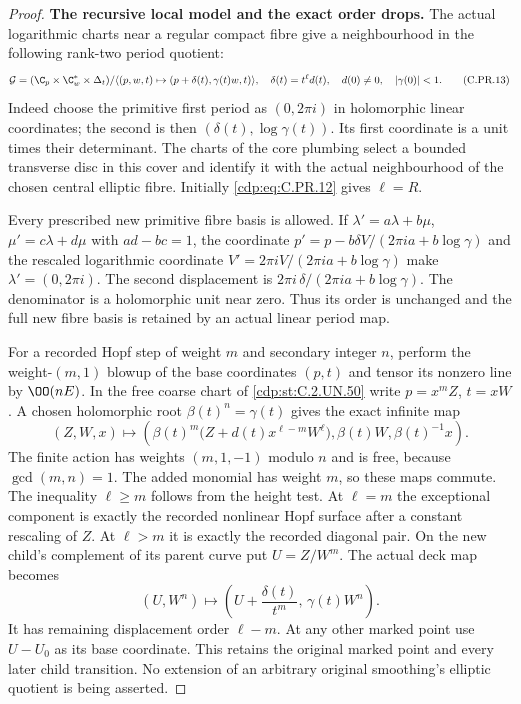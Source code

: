 \begin{proof}
\par\medskip\noindent\textbf{The recursive local model and the exact order drops.}
The actual logarithmic charts near a regular compact fibre give
a neighbourhood in the following rank-two period quotient:
\[
 \mathcal G=
 (\C_p\times\C_w^*\times\Delta_t)/
 \langle(p,w,t)\mapsto(p+\delta(t),\gamma(t)w,t)\rangle,
 \quad
 \delta(t)=t^\ell d(t),\quad d(0)\ne0,\quad|\gamma(0)|<1 .
                                                        \tag{C.PR.13}\label{cdp:eq:C.PR.13}
\]
Indeed choose the primitive first period as $(0,2\pi i)$ in
holomorphic linear coordinates; the second is then
$(\delta(t),\log\gamma(t))$. Its first coordinate is a unit
times their determinant. The charts of the core plumbing select
a bounded transverse disc in this cover and identify it with
the actual neighbourhood of the chosen central elliptic fibre.
Initially \eqref{cdp:eq:C.PR.12} gives $\ell=R$.

Every prescribed new primitive fibre basis is allowed. If
$\lambda'=a\lambda+b\mu$, $\mu'=c\lambda+d\mu$ with
$ad-bc=1$, the coordinate
$p'=p-b\delta V/(2\pi ia+b\log\gamma)$ and the rescaled
logarithmic coordinate
$V'=2\pi iV/(2\pi ia+b\log\gamma)$ make $\lambda'=(0,2\pi i)$.
The second displacement is
$2\pi i\,\delta/(2\pi ia+b\log\gamma)$.
The denominator is a holomorphic unit near zero.
Thus its order is unchanged and the full new fibre basis is
retained by an actual linear period map.

For a recorded Hopf step of weight $m$ and secondary integer $n$,
perform the weight-$(m,1)$ blowup of the base coordinates $(p,t)$
and tensor its nonzero line by $\OO(nE)$. In the free coarse
chart of \ref{cdp:st:C.2.UN.50} write $p=x^mZ$, $t=xW$.
A chosen holomorphic root $\beta(t)^n=\gamma(t)$ gives the exact
infinite map
\[
 (Z,W,x)\longmapsto
 \left(\beta(t)^m
    \bigl(Z+d(t)x^{\ell-m}W^\ell\bigr),
       \beta(t)W,\beta(t)^{-1}x\right).
                                                        \tag{C.PR.14}\label{cdp:eq:C.PR.14}
\]
The finite action has weights $(m,1,-1)$ modulo $n$ and is free,
because $\gcd(m,n)=1$. The added monomial has weight $m$,
so these maps commute. The inequality $\ell\ge m$ follows
from the height test. At $\ell=m$ the exceptional component
is exactly the recorded nonlinear Hopf surface after a constant
rescaling of $Z$. At $\ell>m$ it is exactly the recorded
diagonal pair. On the new child's complement of its parent curve
put $U=Z/W^m$. The actual deck map becomes
\[
        (U,W^n)\longmapsto
       \left(U+\frac{\delta(t)}{t^m},\,\gamma(t)W^n\right).
                                                        \tag{C.PR.15}\label{cdp:eq:C.PR.15}
\]
It has remaining displacement order $\ell-m$.
At any other marked point use $U-U_0$ as its base coordinate.
This retains the original marked point and every later child
transition. No extension of an arbitrary original smoothing's
elliptic quotient is being asserted.


\end{proof}
